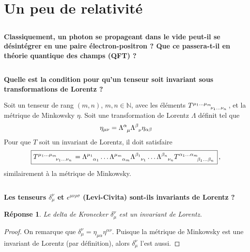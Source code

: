 \documentclass{article}
\numberwithin{equation}{section}
\theoremstyle{solution}
\newtheorem{solution}{Réponse}[section]
\begin{document}
\section{Un peu de relativité}

\subsection{}
\textbf{Classiquement, un photon se propageant dans le vide peut-il se désintégrer en une paire
électron-positron ? 
Que ce passera-t-il en théorie quantique des champs (QFT) ?}
\subsection{}
\textbf{Quelle est la condition pour qu’un tenseur soit invariant sous transformations de Lorentz ?}
\vspace{2ex}

Soit un tenseur de rang $(m,n)$, $m,n \in \mathbb{N}$, avec les éléments $T\indices{^{\mu_1\dots \mu_m}_{\nu_1\dots\nu_n}}$, et la métrique de Minkowsky $\eta$. Soit une transformation de 
Lorentz $\Lambda$ définit tel que
\begin{equation}
        \eta_{\mu \nu} = \Lambda\indices{^\alpha_\mu} \Lambda\indices{^\beta_\nu} \eta_{\alpha\beta}
\end{equation} 
Pour que $T$ soit un invariant de Lorentz, il doit satisfaire
\begin{equation}
        \boxed{ T\indices{^{\mu_1\dots\mu_m}_{\nu_1\dots\nu_n}} = \Lambda\indices{^{\mu_1}_{\alpha_1}} \dots \Lambda\indices{^{\mu_m}_{\alpha_m}} 
        \Lambda\indices{^{\beta_1}_{\nu_1}} \dots \Lambda\indices{^{\beta_n}_{\nu_n}} T\indices{^{\alpha_1\dots \alpha_m}_{\beta_1 \dots \beta_n}}} \, ,
\end{equation}
similairement à la métrique de Minkowsky.

\subsection{}
\textbf{Les tenseurs $\delta_{\mu}^{\nu}$ et  $\epsilon^{\mu\nu\rho\sigma}$ (Levi-Civita) sont-ils invariants de Lorentz ?}
\vspace{2ex}
\begin{solution}
        Le delta de Kronecker $\delta_\mu^{\nu}$ est un invariant de Lorentz.
\end{solution}
\begin{proof}
On remarque que $\delta^{\nu}_{\mu} = \eta_{\mu \alpha} \eta^{\alpha\nu}$. Puisque la métrique de Minkowsky est une invariant de 
Lorentz (par définition), alors $\delta^{\nu}_{\mu}$ l'est aussi.
\end{proof}
        
\end{document}
